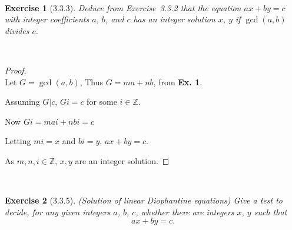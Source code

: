 \documentclass[12pt]{article}
\newcommand{\XB}{\color{black}}
\newcommand{\XBB}{\color{blue}}
\newcommand{\ds}{\displaystyle}
\theoremstyle{plain}
\newtheorem{ex}{Exercise}
\begin{document}
\newpage

\XBB\hrulefill\XB \\
\begin{ex} [3.3.3]
  Deduce from Exercise~3.3.2 that the equation $ax+by=c$ with integer coefficients $a$, $b$, and $c$ has an integer solution $x$, $y$ if $\gcd(a,b)$ divides $c$.
\end{ex}
\XBB\hrulefill\XB \\

\begin{proof}
  \ \\

  Let $ G = \gcd(a, b) $, Thus $ G = ma + nb $, from \textbf{Ex. 1}.
  
  Assuming $ G|c $, $ Gi = c $ for some $ i \in \mathbb{Z} $.

  Now $ \ds Gi = mai +nbi = c $

  Letting $ mi = x $ and $ bi = y $, $ ax + by = c $.

  As $ m, n, i \in \mathbb{Z} $, $ x, y $ are an integer solution.

\end{proof}

\newpage

\XBB\hrulefill\XB \\
\begin{ex} [3.3.5]
  (Solution of linear Diophantine equations) Give a test to decide, for any given integers $ a $, $ b $, $ c $, whether there are integers $x$, $y$ such that
  \[
    ax + by = c.
  \]
\end{ex}
\XBB\hrulefill\XB \\
\end{document}
